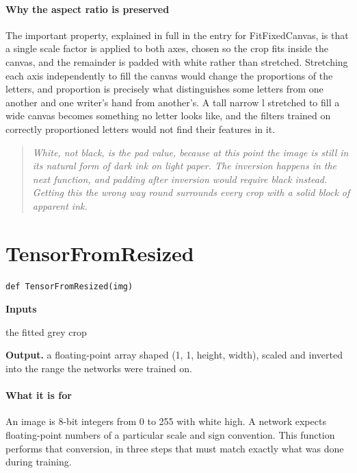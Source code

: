 \paragraph{Why the aspect ratio is preserved}
The important property, explained in full in the entry for FitFixedCanvas, is that a single scale factor is applied to both axes, chosen so the crop fits inside the canvas, and the remainder is padded with white rather than stretched. Stretching each axis independently to fill the canvas would change the proportions of the letters, and proportion is precisely what distinguishes some letters from one another and one writer's hand from another's. A tall narrow l stretched to fill a wide canvas becomes something no letter looks like, and the filters trained on correctly proportioned letters would not find their features in it.


\begin{quote}\small\itshape White, not black, is the pad value, because at this point the image is still in its natural form of dark ink on light paper. The inversion happens in the next function, and padding after inversion would require black instead. Getting this the wrong way round surrounds every crop with a solid block of apparent ink.\end{quote}

\section{TensorFromResized}
\begin{lstlisting}[style=sig]
def TensorFromResized(img)
\end{lstlisting}

\noindent\textbf{Inputs}
\begin{description}[leftmargin=2.2em,style=nextline,font=\normalfont\ttfamily]\setlength\itemsep{1pt}
  \item[{img}] \normalfont the fitted grey crop
\end{description}

\noindent\textbf{Output.} a floating-point array shaped (1, 1, height, width), scaled and inverted into the range the networks were trained on.


\paragraph{What it is for}
An image is 8-bit integers from 0 to 255 with white high. A network expects floating-point numbers of a particular scale and sign convention. This function performs that conversion, in three steps that must match exactly what was done during training.


